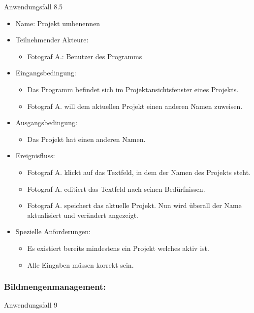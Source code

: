 	\begin{description}
\item[Anwendungsfall 8.5]
\end{description}
 
\begin{itemize}
\item Name: Projekt umbenennen
\item Teilnehmender Akteure:
\begin{itemize}
\item Fotograf A.: Benutzer des Programms
\end{itemize}
\item Eingangsbedingung:
\begin{itemize}
\item Das Programm befindet sich im Projektansichtsfenster eines Projekts.
\item Fotograf A. will dem aktuellen Projekt einen anderen Namen zuweisen.
\end{itemize}
\item Ausgangsbedingung:
\begin{itemize}
\item Das Projekt hat einen anderen Namen.
\end{itemize}
\item Ereignisfluss:
\begin{itemize}
\item Fotograf A. klickt auf das Textfeld, in dem der Namen des Projekts steht.
\item Fotograf A. editiert das Textfeld nach seinen Bedürfnissen.
\item Fotograf A. speichert das aktuelle Projekt. Nun wird überall der Name aktualisiert und verändert angezeigt.
\end{itemize}
\item Spezielle Anforderungen:
\begin{itemize}
\item Es existiert bereits mindestens ein Projekt welches aktiv ist.
\item Alle Eingaben müssen korrekt sein.
\end{itemize}
\end{itemize}

	\subsubsection{Bildmengenmanagement:}
	
	\begin{description}
		\item[Anwendungsfall 9]
	\end{description}
	
